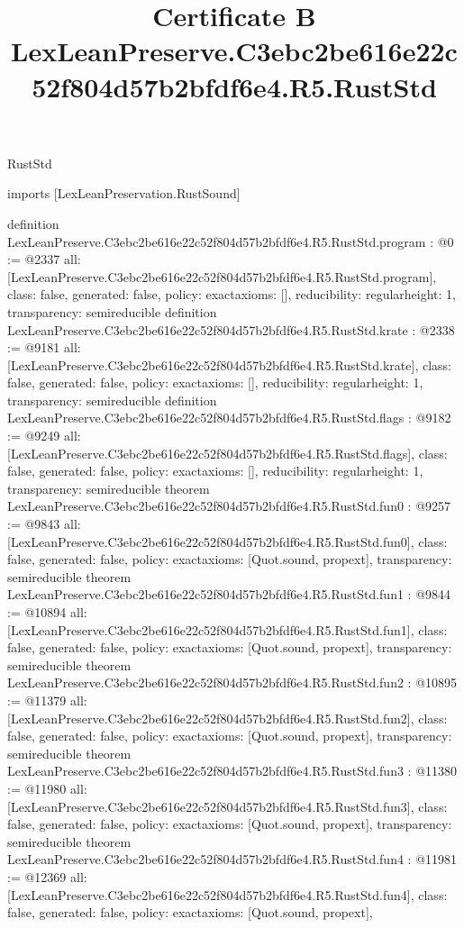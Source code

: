 \begin{lexlean}{RustStd}
\title{Certificate B LexLeanPreserve.C3ebc2be616e22c52f804d57b2bfdf6e4.R5.RustStd}
\begin{coremodule}
imports [LexLeanPreservation.RustSound]

definition LexLeanPreserve.C3ebc2be616e22c52f804d57b2bfdf6e4.R5.RustStd.program : @0 := @2337 {
  all: [LexLeanPreserve.C3ebc2be616e22c52f804d57b2bfdf6e4.R5.RustStd.program],
  class: false,
  generated: false,
  policy: exact{axioms: []},
  reducibility: regular{height: 1},
  transparency: semireducible
}
definition LexLeanPreserve.C3ebc2be616e22c52f804d57b2bfdf6e4.R5.RustStd.krate : @2338 := @9181 {
  all: [LexLeanPreserve.C3ebc2be616e22c52f804d57b2bfdf6e4.R5.RustStd.krate],
  class: false,
  generated: false,
  policy: exact{axioms: []},
  reducibility: regular{height: 1},
  transparency: semireducible
}
definition LexLeanPreserve.C3ebc2be616e22c52f804d57b2bfdf6e4.R5.RustStd.flags : @9182 := @9249 {
  all: [LexLeanPreserve.C3ebc2be616e22c52f804d57b2bfdf6e4.R5.RustStd.flags],
  class: false,
  generated: false,
  policy: exact{axioms: []},
  reducibility: regular{height: 1},
  transparency: semireducible
}
theorem LexLeanPreserve.C3ebc2be616e22c52f804d57b2bfdf6e4.R5.RustStd.fun0 : @9257 := @9843 {
  all: [LexLeanPreserve.C3ebc2be616e22c52f804d57b2bfdf6e4.R5.RustStd.fun0],
  class: false,
  generated: false,
  policy: exact{axioms: [Quot.sound, propext]},
  transparency: semireducible
}
theorem LexLeanPreserve.C3ebc2be616e22c52f804d57b2bfdf6e4.R5.RustStd.fun1 : @9844 := @10894 {
  all: [LexLeanPreserve.C3ebc2be616e22c52f804d57b2bfdf6e4.R5.RustStd.fun1],
  class: false,
  generated: false,
  policy: exact{axioms: [Quot.sound, propext]},
  transparency: semireducible
}
theorem LexLeanPreserve.C3ebc2be616e22c52f804d57b2bfdf6e4.R5.RustStd.fun2 : @10895 := @11379 {
  all: [LexLeanPreserve.C3ebc2be616e22c52f804d57b2bfdf6e4.R5.RustStd.fun2],
  class: false,
  generated: false,
  policy: exact{axioms: [Quot.sound, propext]},
  transparency: semireducible
}
theorem LexLeanPreserve.C3ebc2be616e22c52f804d57b2bfdf6e4.R5.RustStd.fun3 : @11380 := @11980 {
  all: [LexLeanPreserve.C3ebc2be616e22c52f804d57b2bfdf6e4.R5.RustStd.fun3],
  class: false,
  generated: false,
  policy: exact{axioms: [Quot.sound, propext]},
  transparency: semireducible
}
theorem LexLeanPreserve.C3ebc2be616e22c52f804d57b2bfdf6e4.R5.RustStd.fun4 : @11981 := @12369 {
  all: [LexLeanPreserve.C3ebc2be616e22c52f804d57b2bfdf6e4.R5.RustStd.fun4],
  class: false,
  generated: false,
  policy: exact{axioms: [Quot.sound, propext]},
}
\end{coremodule}
\end{lexlean}
